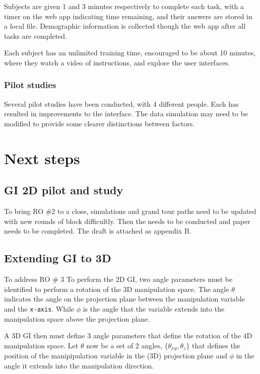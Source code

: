 \documentclass[
  11,
]{article}
\begin{document}
Subjects are given 1 and 3 minutes respectively to complete each task, with a timer on the web app indicating time remaining, and their answers are stored in a local file. Demographic information is collected though the web app after all tasks are completed.

Each subject has an unlimited training time, encouraged to be about 10 minutes, where they watch a video of instructions, and explore the user interfaces.

\hypertarget{pilot-studies}{%
\subsubsection{Pilot studies}\label{pilot-studies}}

Several pilot studies have been conducted, with 4 different people. Each has resulted in improvements to the interface. The data simulation may need to be modified to provide some clearer distinctions between factors.

\hypertarget{next-steps}{%
\section{Next steps}\label{next-steps}}

\hypertarget{gi-2d-pilot-and-study}{%
\subsection{GI 2D pilot and study}\label{gi-2d-pilot-and-study}}

To bring RO \#2 to a close, simulations and grand tour paths need to be updated with new rounds of block difficultly. Then the needs to be conducted and paper needs to be completed. The draft is attached as appendix B.

\hypertarget{extending-gi-to-3d}{%
\subsection{Extending GI to 3D}\label{extending-gi-to-3d}}

To address RO \# 3 To perform the 2D GI, two angle parameters must be identified to perform a rotation of the 3D manipulation space. The angle \(\theta\) indicates the angle on the projection plane between the manipulation variable and the \texttt{x-axis}. While \(\phi\) is the angle that the variable extends into the manipulation space above the projection plane.

A 3D GI then must define 3 angle parameters that define the rotation of the 4D manipulation space. Let \(\theta\) now be a set of 2 angles, \(\{\theta_{xy}, \theta_z\}\) that defines the position of the manipipulation variable in the (3D) projection plane and \(\phi\) in the angle it extends into the manipulation direction.
\end{document}

